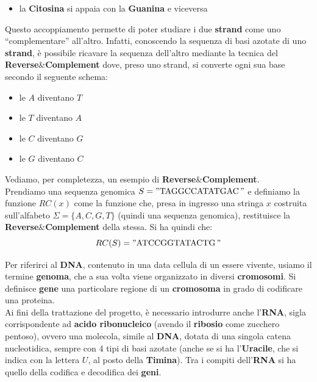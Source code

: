 \documentclass[a4paper,12pt, oneside]{book}
\begin{document}
\begin{shaded}
\begin{itemize}
    \item la \textbf{Citosina} si appaia con la \textbf{Guanina} e viceversa
  \end{itemize}
  Questo accoppiamento permette di poter studiare i due \textbf{strand} come uno
  ``complementare'' all'altro. Infatti, conoscendo la sequenza di basi azotate
  di 
  uno \textbf{strand}, è possibile ricavare la sequenza dell'altro mediante la
  tecnica del \textbf{Reverse}\&\textbf{Complement} dove, preso uno strand, si
  converte ogni sua base secondo il seguente schema:
  \begin{itemize}
    \item le $A$ diventano $T$
    \item le $T$ diventano $A$
    \item le $C$ diventano $G$
    \item le $G$ diventano $C$
  \end{itemize}
  \begin{esempio}
    Vediamo, per completezza, un esempio di
    \textbf{Reverse}\textnormal{\&}\textbf{Complement}.\\ 
    Prendiamo una sequenza genomica $S="\mbox{TAGGCCATATGAC}\,"$ e definiamo la
    funzione 
    $RC(x)$ come la funzione che, presa in ingresso una stringa $x$ costruita
    sull'alfabeto $\Sigma=\{A,C,G,T\}$ (quindi una sequenza genomica),
    restituisce 
    la \textbf{Reverse}\textnormal{\&}\textbf{Complement} della stessa. Si ha
    quindi che: 
    \[RC(S)="\mbox{ATCCGGTATACTG}\,"\]
  \end{esempio}
  Per riferirci al \textbf{DNA}, contenuto in una data cellula di un essere
  vivente, usiamo il termine \textbf{genoma}, che a sua volta viene organizzato
  in 
  diversi \textbf{cromosomi}. Si definisce \textbf{gene} una particolare regione
  di un \textbf{cromosoma} in grado di codificare una proteina. \\
  Ai fini della trattazione del progetto, è necessario introdurre anche
  l'\textbf{RNA}, sigla corrispondente ad \textbf{acido ribonucleico} (avendo il
  \textbf{ribosio} come zucchero pentoso), ovvero una
  molecola, simile al \textbf{DNA}, dotata di una singola 
  catena nucleotidica, sempre con 4 tipi di basi azotate (anche se si ha
  l'\textbf{Uracile}, che si indica con la lettera $U$, al posto della
  \textbf{Timina}). Tra i compiti dell'\textbf{RNA} si ha quello della codifica
  e 
  decodifica dei \textbf{geni}.

\end{shaded}
\end{document}

